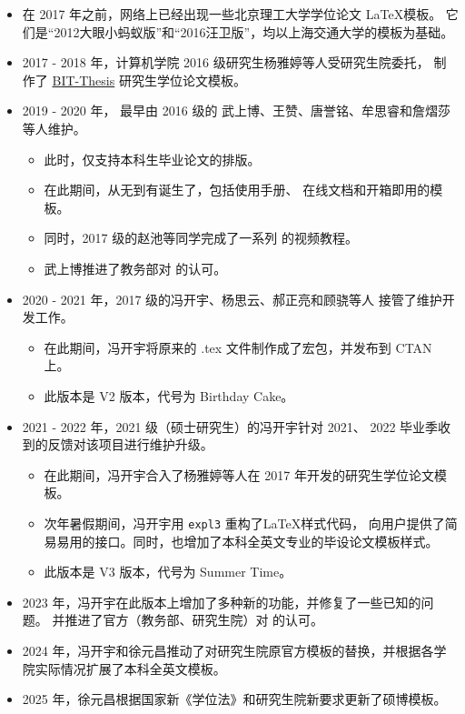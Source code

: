 \begin{appendices}
\begin{itemize}[nosep]
  \item 在 2017 年之前，网络上已经出现一些北京理工大学学位论文 \LaTeX 模板。
    它们是“2012大眼小蚂蚁版”和“2016汪卫版”，均以上海交通大学的模板为基础。
  \item 2017 - 2018 年，计算机学院 2016 级研究生杨雅婷等人受研究生院委托，
    制作了 \href{https://github.com/BIT-thesis/LaTeX-template}{BIT-Thesis}
    研究生学位论文模板。
  \item 2019 - 2020 年，\href{https://github.com/BITNP/BIThesis/}{\BIThesis} 最早由 2016 级的
    武上博、王赞、唐誉铭、牟思睿和詹熠莎等人维护。
    \begin{itemize}[nosep]
    \item 此时，\BIThesis 仅支持本科生毕业论文的排版。
    \item 在此期间，\BIThesis 从无到有诞生了，包括使用手册、
      在线文档和开箱即用的模板。
    \item 同时，2017 级的赵池等同学完成了一系列 \BIThesis
      的视频教程。
    \item 武上博推进了教务部对 \BIThesis{} 的认可。
  \end{itemize}
  \item 2020 - 2021 年，2017 级的冯开宇、杨思云、郝正亮和顾骁等人
      接管了维护开发工作。
  \begin{itemize}[nosep]
    \item 在此期间，冯开宇将原来的 .tex 文件制作成了宏包，并发布到 CTAN 上。
    \item 此版本是 V2 版本，代号为 Birthday Cake。
  \end{itemize}
  \item 2021 - 2022 年，2021 级（硕士研究生）的冯开宇针对 2021、
      2022 毕业季收到的反馈对该项目进行维护升级。
  \begin{itemize}[nosep]
    \item 在此期间，冯开宇合入了杨雅婷等人在 2017 年开发的研究生学位论文模板。
    \item 次年暑假期间，冯开宇用 \verb|expl3| 重构了\LaTeX 样式代码，
      向用户提供了简易易用的接口。同时，也增加了本科全英文专业的毕设论文模板样式。
    \item 此版本是 V3 版本，代号为 Summer Time。
  \end{itemize}
  \item 2023 年，冯开宇在此版本上增加了多种新的功能，并修复了一些已知的问题。
  并推进了官方（教务部、研究生院）对 \BIThesis 的认可。
  \item 2024 年，冯开宇和徐元昌推动了对研究生院原官方模板的替换，并根据各学院实际情况扩展了本科全英文模板。
  \item 2025 年，徐元昌根据国家新《学位法》和研究生院新要求更新了硕博模板。
\end{itemize}

\end{appendices}
